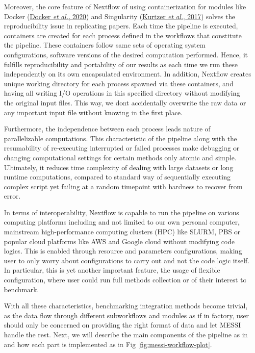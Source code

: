 \documentclass[
]{article}
\begin{document}
Moreover, the core feature of Nextflow of using containerization for modules like Docker (\protect\hyperlink{ref-docker2020docker}{Docker \emph{et al.}, 2020}) and Singularity (\protect\hyperlink{ref-kurtzer2017singularity}{Kurtzer \emph{et al.}, 2017}) solves the reproducibility issue in replicating papers.
Each time the pipeline is executed, containers are created for each process defined in the workflows that constitute the pipeline. These containers follow same sets of operating system configurations, software versions of the desired computation performed. Hence, it fulfills reproducibility and portability of our results as each time we run these independently on its own encapsulated environment.
In addition, Nextflow creates unique working directory for each process spawned via these containers, and having all writing I/O operations in this specified directory without modifying the original input files. This way, we dont accidentally overwrite the raw data or any important input file without knowing in the first place.

Furthermore, the independence between each process leads nature of parallelizable computations. This characteristic of the pipeline along with the resumability of re-executing interrupted or failed processes make debugging or changing computational settings for certain methods only atomic and simple. Ultimately, it reduces time complexity of dealing with large datasets or long runtime computations, compared to standard way of sequentially executing complex script yet failing at a random timepoint with hardness to recover from error.

In terms of interoperability, Nextflow is capable to run the pipeline on various computing platforms including and not limited to our own personal computer, mainstream high-performance computing clusters (HPC) like SLURM, PBS or popular cloud platforms like AWS and Google cloud without modifying code logics. This is enabled through resource and parameters configurations, making user to only worry about configurations to carry out and not the code logic itself. In particular, this is yet another important feature, the usage of flexible configuration, where user could run full methods collection or of their interest to benchmark.

With all these characteristics, benchmarking integration methods become trivial, as the data flow through different subworkflows and modules as if in factory, user should only be concerned on providing the right format of data and let MESSI handle the rest. Next, we will describe the main components of the pipeline as in and how each part is implemented as in Fig \ref{fig:messi-workflow-plot}.
\end{document}
